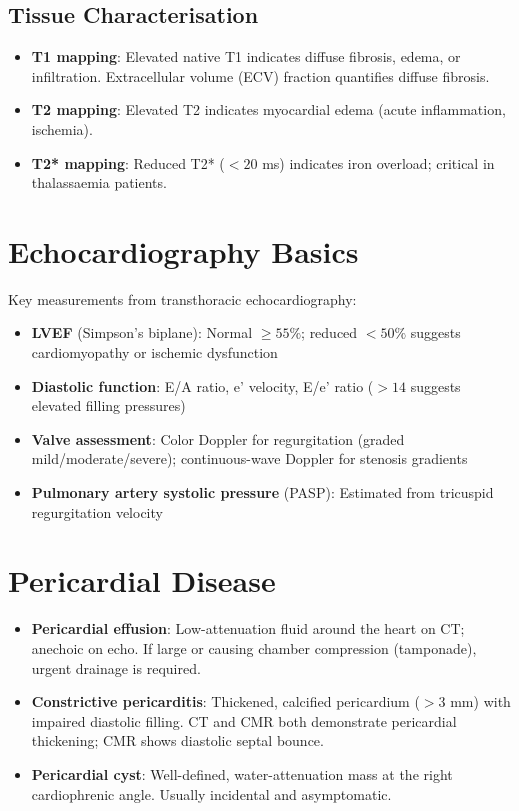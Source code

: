 \subsection{Tissue Characterisation}
\begin{itemize}
  \item \textbf{T1 mapping}: Elevated native T1 indicates diffuse fibrosis, edema, or infiltration. Extracellular volume (ECV) fraction quantifies diffuse fibrosis.
  \item \textbf{T2 mapping}: Elevated T2 indicates myocardial edema (acute inflammation, ischemia).
  \item \textbf{T2* mapping}: Reduced T2* ($< 20$ ms) indicates iron overload; critical in thalassaemia patients.
\end{itemize}


\section{Echocardiography Basics}
Key measurements from transthoracic echocardiography:
\begin{itemize}
  \item \textbf{LVEF} (Simpson's biplane): Normal $\geq 55\%$; reduced $< 50\%$ suggests cardiomyopathy or ischemic dysfunction
  \item \textbf{Diastolic function}: E/A ratio, e' velocity, E/e' ratio ($> 14$ suggests elevated filling pressures)
  \item \textbf{Valve assessment}: Color Doppler for regurgitation (graded mild/moderate/severe); continuous-wave Doppler for stenosis gradients
  \item \textbf{Pulmonary artery systolic pressure} (PASP): Estimated from tricuspid regurgitation velocity
\end{itemize}


\section{Pericardial Disease}
\begin{itemize}
  \item \textbf{Pericardial effusion}: Low-attenuation fluid around the heart on CT; anechoic on echo. If large or causing chamber compression (tamponade), urgent drainage is required.
  \item \textbf{Constrictive pericarditis}: Thickened, calcified pericardium ($> 3$ mm) with impaired diastolic filling. CT and CMR both demonstrate pericardial thickening; CMR shows diastolic septal bounce.
  \item \textbf{Pericardial cyst}: Well-defined, water-attenuation mass at the right cardiophrenic angle. Usually incidental and asymptomatic.
\end{itemize}


